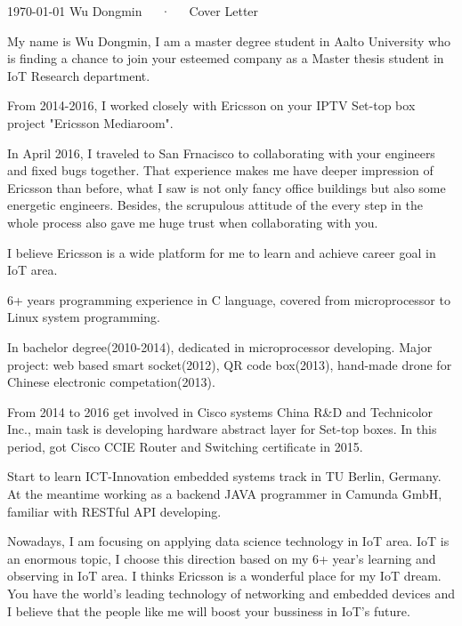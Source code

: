 \documentclass[11pt, a4paper]{awesome-cv}
\begin{document}
\makecvheader[R]

\makecvfooter
  {\today}
  {Wu Dongmin~~~·~~~Cover Letter}
  {}

\makelettertitle

\begin{cvletter}

My name is Wu Dongmin, I am a master degree student in Aalto University who is finding a 
chance to join your esteemed company as a Master thesis student in IoT Research department.

   


From 2014-2016, I worked closely with Ericsson on your IPTV Set-top box project "Ericsson Mediaroom". 

In April 2016, I traveled to San Frnacisco to collaborating with your engineers and fixed bugs together. 
That experience makes me have deeper impression of Ericsson than before, what I saw is not only fancy office buildings
but also some energetic engineers. Besides, the scrupulous attitude of the every step in the whole process also 
gave me huge trust when collaborating with you.

I believe Ericsson is a wide platform for me to learn and achieve career goal in IoT area. 

6+ years programming experience in C language, covered from microprocessor to Linux system programming.

In bachelor degree(2010-2014), dedicated in microprocessor developing. Major project: web based smart socket(2012), QR code box(2013), hand-made drone for Chinese electronic competation(2013).

From 2014 to 2016 get involved in Cisco systems China R\&D and Technicolor Inc., 
main task is developing hardware abstract layer for Set-top boxes. 
In this period, got Cisco CCIE Router and Switching certificate in 2015.

Start to learn ICT-Innovation embedded systems track in TU Berlin, Germany. At the meantime working as a backend JAVA programmer in Camunda GmbH, familiar with RESTful API developing.

Nowadays, I am focusing on applying data science technology in IoT area. IoT is an enormous topic, I choose this direction based on my 6+ year's learning and observing in IoT area. I thinks Ericsson is a wonderful place for my IoT dream. 
You have the world's leading technology of networking and embedded devices and I believe that the people like me will boost your bussiness in IoT's future.



\end{cvletter}


\makeletterclosing
\end{document}
